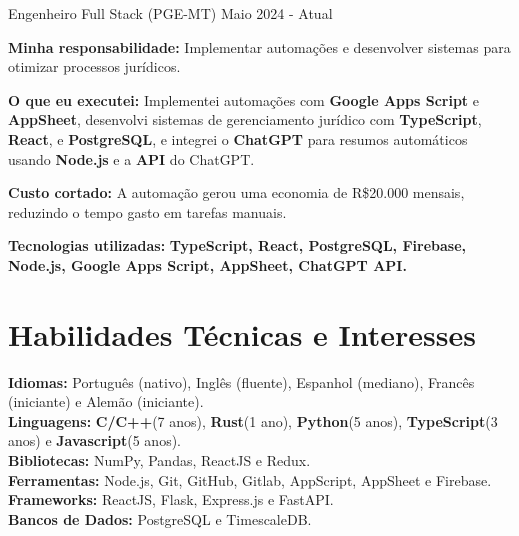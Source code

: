 \vspace{-2mm}

\resumeSubheading
{ Engenheiro Full Stack (PGE-MT)}{}
{}{Maio 2024 - Atual}
\vspace{-2.0mm}
\resumeItemListStart
\item \textbf{Minha responsabilidade:} Implementar automações e desenvolver sistemas para otimizar processos jurídicos.
\item \textbf{O que eu executei:} Implementei automações com \textbf{Google Apps Script} e \textbf{AppSheet}, desenvolvi sistemas de gerenciamento jurídico com \textbf{TypeScript}, \textbf{React}, e \textbf{PostgreSQL}, e integrei o \textbf{ChatGPT} para resumos automáticos usando \textbf{Node.js} e a \textbf{API} do ChatGPT.
\item \textbf{Custo cortado:} A automação gerou uma economia de R\$20.000 mensais, reduzindo o tempo gasto em tarefas manuais.
\item \textbf{Tecnologias utilizadas:} \textbf{TypeScript, React, PostgreSQL, Firebase, Node.js, Google Apps Script, AppSheet, ChatGPT API.}
\resumeItemListEnd

\vspace{-5.5mm}
\resumeSubHeadingListEnd

\section{\textbf{Habilidades Técnicas e Interesses}}
\begin{itemize}[leftmargin=0.05in, label={}]
    \small{\item{
          \textbf{Idiomas:}{ Português (nativo), Inglês (fluente), Espanhol (mediano), Francês (iniciante) e Alemão (iniciante).} \\
          \textbf{Linguagens:}{ \textbf{C/C++}(7 anos), \textbf{Rust}(1 ano), \textbf{Python}(5 anos), \textbf{TypeScript}(3 anos) e \textbf{Javascript}(5 anos). } \\
          \textbf{Bibliotecas:}{ NumPy, Pandas, ReactJS e Redux. }\\
          \textbf{Ferramentas:}{ Node.js, Git, GitHub,  Gitlab, AppScript, AppSheet e Firebase.} \\
          \textbf{Frameworks:}{ ReactJS, Flask, Express.js e FastAPI. } \\
          \textbf{Bancos de Dados:}{ PostgreSQL e TimescaleDB. } \\
          }}
\end{itemize}


